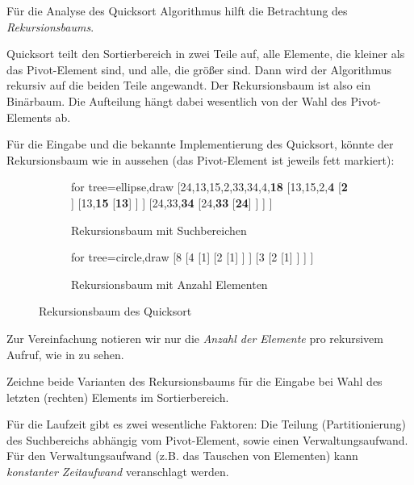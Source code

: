 \documentclass[10pt, a4paper, ngerman]{arbeitsblatt}
\begin{document}
\ReiheTitel

Für die Analyse des Quicksort Algorithmus hilft die Betrachtung
des \emph{Rekursionsbaums}.

Quicksort teilt den Sortierbereich in zwei
Teile auf, alle Elemente, die kleiner als das Pivot-Element sind, und alle, die
größer sind. Dann wird der Algorithmus rekursiv auf die beiden Teile angewandt.
Der Rekursionsbaum ist also ein Binärbaum. Die Aufteilung hängt dabei wesentlich
von der Wahl des Pivot-Elements ab.

Für die Eingabe  und die bekannte Implementierung des
Quicksort, könnte der Re\-kursions\-baum wie in  aussehen
(das Pivot-Element ist jeweils fett markiert):

\begin{figure}[ht]
	\begin{subfigure}[ht]{.5\linewidth}\centering
		\begin{forest}
		for tree={ellipse,draw}
		[{24,13,15,2,33,34,4,\textbf{18}}
			[{13,15,2,\textbf{4}}
				[{\textbf{2}}
				]
				[{13,\textbf{15}}
					[\textbf{13}]
				]
			]
			[{24,33,\textbf{34}}
				[{24,\textbf{33}}
					[\textbf{24}]
				]
			]\quad
		]
		\end{forest}
		\caption{Rekursionsbaum mit Suchbereichen}\label{abb:rekbaum-1}
	\end{subfigure}%
	\begin{subfigure}[ht]{.5\linewidth}\centering
		\begin{forest}
		for tree={circle,draw}
		[8
			[4
				[1]
				[2
					[1]
				]
			]
			[3
				[2
					[1]
				]
			]
		]
		\end{forest}
		\caption{Rekursionsbaum mit Anzahl Elementen}\label{abb:rekbaum-2}
	\end{subfigure}
	\caption{Rekursionsbaum des Quicksort}\label{abb:rekbaum}
\end{figure}

Zur Vereinfachung notieren wir nur die \emph{Anzahl der Elemente} pro rekursivem Aufruf,
wie in  zu sehen.

\begin{aufgabe}
	\label{aufg:rekursionsbaum}
	Zeichne beide Varianten des Rekursionsbaums für die Eingabe  bei Wahl
	des letzten (rechten) Elements im Sortierbereich.
\end{aufgabe}

Für die Laufzeit gibt es zwei wesentliche Faktoren: Die Teilung (Partitionierung) des Suchbereichs
abhängig vom Pivot-Element, sowie einen Verwaltungsaufwand. Für den Verwaltungsaufwand (z.B. das Tauschen
von Elementen) kann \emph{konstanter Zeitaufwand} veranschlagt werden.
\end{document}
